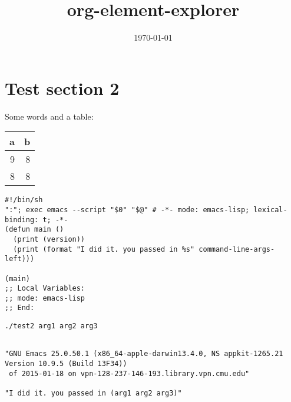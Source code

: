 \documentclass[aps,prb,citeautoscript,preprint,citeautoscript,showkeys]{revtex4-1}
\date{\today}
\title{org-element-explorer}
\begin{document}
\section{Test section 2}
\label{sec-1}

Some words and a table:

\begin{center}
\begin{tabular}{rr}
a & b\\
\hline
9 & 8\\
8 & 8\\
\end{tabular}
\end{center}


\begin{verbatim}
#!/bin/sh
":"; exec emacs --script "$0" "$@" # -*- mode: emacs-lisp; lexical-binding: t; -*-
(defun main ()
  (print (version))
  (print (format "I did it. you passed in %s" command-line-args-left)))

(main)
;; Local Variables:
;; mode: emacs-lisp
;; End:
\end{verbatim}


\begin{verbatim}
./test2 arg1 arg2 arg3
\end{verbatim}
\begin{verbatim}

"GNU Emacs 25.0.50.1 (x86_64-apple-darwin13.4.0, NS appkit-1265.21 Version 10.9.5 (Build 13F34))
 of 2015-01-18 on vpn-128-237-146-193.library.vpn.cmu.edu"

"I did it. you passed in (arg1 arg2 arg3)"
\end{verbatim}
\end{document}
